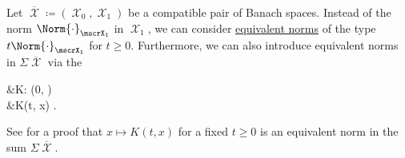 \begin{definition}\label{def:k_functional}
  Let \( \overline{\mscrX} \coloneqq ( \mscrX_0, \mscrX_1 ) \) be a compatible pair of Banach spaces. Instead of the norm \( \Norm{\cdot}_{\mscrX_1} \) in \( \mscrX_1 \), we can consider \hyperref[def:equivalent_metrics]{equivalent norms} of the type \( t\Norm{\cdot}_{\mscrX_1} \) for \( t \geq 0 \). Furthermore, we can also introduce equivalent norms in \( \Sigma \overline{\mscrX} \) via the 
  \begin{AlignedEquation}\label{eq:def:k_functional}
    &K: (0, \infty) \times {\Sigma \overline{\mscrX}} \\
    &K(t, x) \coloneqq \inf {}.
  \end{AlignedEquation}

  See  for a proof that \( x \mapsto K(t, x) \) for a fixed \( t \geq 0 \) is an equivalent norm in the sum \( \Sigma \overline{\mscrX} \).
\end{definition}

